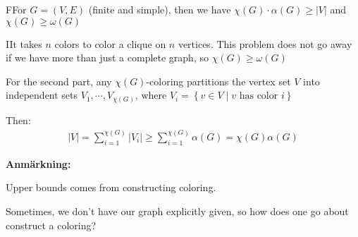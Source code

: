 \par\bigskip
\begin{lem}
  FFor $G = (V,E)$ (finite and simple), then we have $\chi(G)\cdot\alpha(G)\geq\left|V\right|$ and $\chi(G)\geq\omega(G)$
\end{lem}
\newpage
\begin{prf}
  IIt takes $n$ colors to color a clique on $n$ vertices. This problem does not go away if we have more than just a complete graph, so $\chi(G)\geq\omega(G)$ 
  \par\bigskip
  \noindent For the second part, any $\chi(G)$-coloring partitions the vertex set $V$ into independent sets $V_1,\cdots,V_{\chi(G)}$, where $V_i = \left\{v\in V\;|\;\text{$v$ has color $i$}\right\}$
  \par\bigskip
  \noindent Then:
  \begin{equation*}
    \begin{gathered}
      \left|V\right| = \sum_{i=1}^{\chi(G)}\left|V_i\right|\geq\sum_{i=1}^{\chi(G)}\alpha(G) = \chi(G)\alpha(G)
    \end{gathered}
  \end{equation*}
\end{prf}
\par\bigskip
\noindent\textbf{Anmärkning:}\par
\noindent Upper bounds comes from constructing coloring.
\par\bigskip
\noindent Sometimes, we don't have our graph explicitly given, so how does one go about construct a coloring?
\par\bigskip

